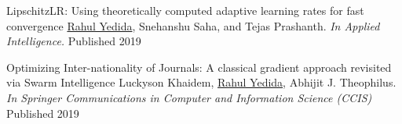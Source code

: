 \begin{cvhonors}
  \cvhonor
    {LipschitzLR: Using theoretically computed adaptive learning rates for fast convergence}
    {\underline{Rahul Yedida}, Snehanshu Saha, and Tejas Prashanth. \textit{In Applied Intelligence.}}
    {Published} %
    {2019} %

  \cvhonor
    {Optimizing Inter-nationality of Journals: A classical gradient approach revisited via Swarm Intelligence}
    {Luckyson Khaidem, \underline{Rahul Yedida}, Abhijit J. Theophilus. \textit{In Springer Communications in Computer and Information Science (CCIS)}}
    {Published} %
    {2019} %
    
\end{cvhonors}
